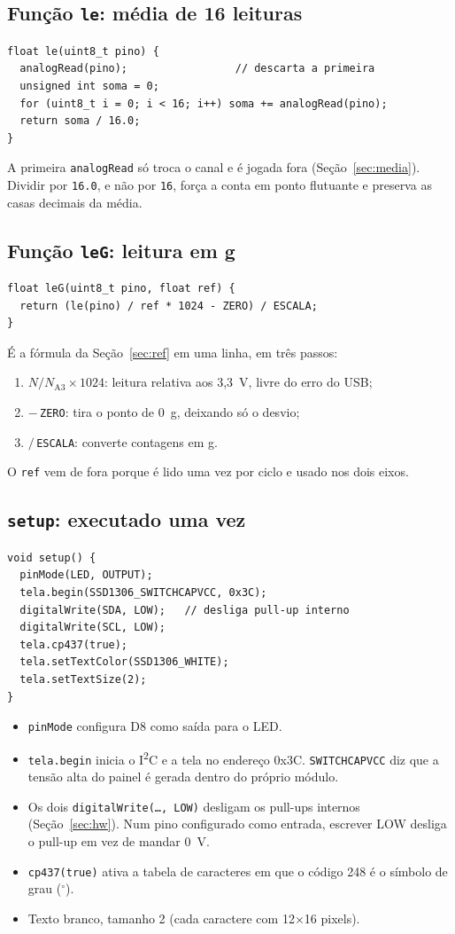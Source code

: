 \documentclass[11pt,a4paper]{article}
\begin{document}
\subsection{Função \texttt{le}: média de 16 leituras}
\begin{lstlisting}
float le(uint8_t pino) {
  analogRead(pino);                 // descarta a primeira
  unsigned int soma = 0;
  for (uint8_t i = 0; i < 16; i++) soma += analogRead(pino);
  return soma / 16.0;
}
\end{lstlisting}
A primeira \texttt{analogRead} só troca o canal e é jogada fora
(Seção~\ref{sec:media}). Dividir por \texttt{16.0}, e não por
\texttt{16}, força a conta em ponto flutuante e preserva as casas
decimais da média.

\subsection{Função \texttt{leG}: leitura em g}
\begin{lstlisting}
float leG(uint8_t pino, float ref) {
  return (le(pino) / ref * 1024 - ZERO) / ESCALA;
}
\end{lstlisting}
É a fórmula da Seção~\ref{sec:ref} em uma linha, em três passos:
\begin{enumerate}
  \item $N/N_\text{A3} \times 1024$: leitura relativa
    aos 3,3~V, livre do erro do USB;
  \item $-\,$\texttt{ZERO}: tira o ponto de 0~g, deixando só o desvio;
  \item $/\,$\texttt{ESCALA}: converte contagens em g.
\end{enumerate}
O \texttt{ref} vem de fora porque é lido uma vez por ciclo e usado nos
dois eixos.

\subsection{\texttt{setup}: executado uma vez}
\begin{lstlisting}
void setup() {
  pinMode(LED, OUTPUT);
  tela.begin(SSD1306_SWITCHCAPVCC, 0x3C);
  digitalWrite(SDA, LOW);   // desliga pull-up interno
  digitalWrite(SCL, LOW);
  tela.cp437(true);
  tela.setTextColor(SSD1306_WHITE);
  tela.setTextSize(2);
}
\end{lstlisting}
\begin{itemize}
  \item \texttt{pinMode} configura D8 como saída para o LED.
  \item \texttt{tela.begin} inicia o I\textsuperscript{2}C e a tela no
    endereço 0x3C. \texttt{SWITCHCAPVCC} diz que a tensão alta do
    painel é gerada dentro do próprio módulo.
  \item Os dois \texttt{digitalWrite(\dots, LOW)} desligam os pull-ups
    internos (Seção~\ref{sec:hw}). Num pino configurado como entrada,
    escrever LOW desliga o pull-up em vez de mandar 0~V.
  \item \texttt{cp437(true)} ativa a tabela de caracteres em que o
    código 248 é o símbolo de grau ($^\circ$).
  \item Texto branco, tamanho 2 (cada caractere com 12$\times$16 pixels).
\end{itemize}
\end{document}
